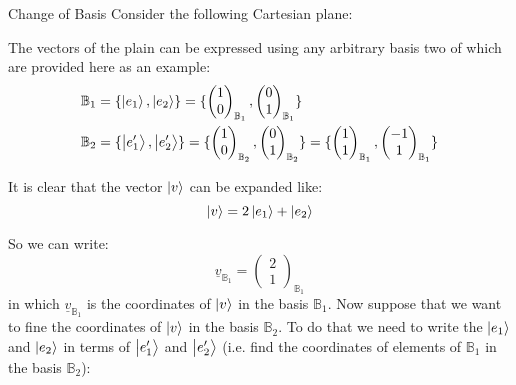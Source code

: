 \begin{example}{Change of Basis}
	Consider the following Cartesian plane:
	
	The vectors of the plain can be expressed using any arbitrary basis two of which are provided here as an example:
	\begin{align*}
		\mathbb{B}_1 &= \{ \ket{e_1}, \ket{e_2} \} = \{ 
		\begin{pmatrix}
			1 \\
			0
		\end{pmatrix}_{\mathbb{B}_1},
		\begin{pmatrix}
			0 \\
			1
		\end{pmatrix}_{\mathbb{B}_1}
		\} \\
		\mathbb{B}_2 &= \{ \ket{e'_1}, \ket{e'_2} \} = \{ 
		\begin{pmatrix}
			1 \\
			0
		\end{pmatrix}_{\mathbb{B}_2},
		\begin{pmatrix}
			0 \\
			1
		\end{pmatrix}_{\mathbb{B}_2}
		\} = 
		\{ 
		\begin{pmatrix}
			1 \\
			1
		\end{pmatrix}_{\mathbb{B}_1},
		\begin{pmatrix}
			-1 \\
			1
		\end{pmatrix}_{\mathbb{B}_1}
		\}
	\end{align*}

	It is clear that the vector $ \ket{v} $ can be expanded like: 
	\begin{equation}
		\ket{v} = 2\ket{e_1} + \ket{e_2}
		\label{equ:changeOfBasis:example:v_in_terms_of_B1}
	\end{equation}
	
	So we can write:
	\[ \underline{v}_{\mathbb{B}_1} = \begin{pmatrix}
		2 \\
		1
	\end{pmatrix}_{\mathbb{B}_1} \]
	in which $\underline{v}_{\mathbb{B}_1}$ is the coordinates of $ \ket{v} $ in the basis $ \mathbb{B}_1 $. Now suppose that we want to fine the coordinates of $ \ket{v} $ in the basis $ \mathbb{B}_2 $. To do that we need to write the $ \ket{e_1} $ and $ \ket{e_2} $ in terms of  $ \ket{e'_1} $ and $ \ket{e'_2} $ (i.e. find the coordinates of elements of $ \mathbb{B}_1 $ in the basis $ \mathbb{B}_2 $):
	

\end{example}
